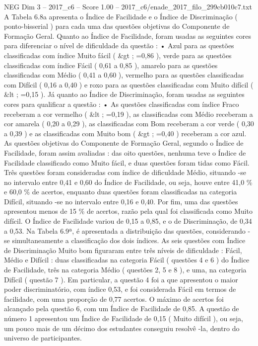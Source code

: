 \begin{textsample}{NEG Dim 3 – 2017\_c6 – Score 1.00 – 2017\_c6/enade\_2017\_filo\_299cb010c7.txt}
A Tabela 6.8a apresenta o Índice de Facilidade e o Índice de Discriminação ( ponto-bisserial ) para cada uma das questões objetivas do Componente de Formação Geral.
Quanto ao Índice de Facilidade, foram usadas as seguintes cores para diferenciar o nível de dificuldade da questão : • Azul para as questões classificadas com índice Muito fácil ( \&gt ; =0,86 ), verde para as questões classificadas com índice Fácil ( 0,61 a 0,85 ), amarelo para as questões classificadas com Médio ( 0,41 a 0,60 ), vermelho para as questões classificadas com Difícil ( 0,16 a 0,40 ) e roxo para as questões classificadas com Muito difícil ( \&lt ; =0,15 ).
Já quanto ao Índice de Discriminação, foram usadas as seguintes cores para qualificar a questão : • As questões classificadas com índice Fraco receberam a cor vermelho ( \&lt ; =0,19 ), as classificadas com Médio receberam a cor amarela ( 0,20 a 0,29 ), as classificadas com Bom receberam a cor verde ( 0,30 a 0,39 ) e as classificadas com Muito bom ( \&gt ; =0,40 ) receberam a cor azul.
As questões objetivas do Componente de Formação Geral, segundo o Índice de Facilidade, foram assim avaliadas : das oito questões, nenhuma teve o Índice de Facilidade classificado como Muito fácil, e duas questões foram tidas como Fácil.
Três questões foram consideradas com índice de dificuldade Médio, situando -se no intervalo entre 0,41 e 0,60 do Índice de Facilidade, ou seja, houve entre 41,0 \% e 60,0 \% de acertos, enquanto duas questões foram classificadas na categoria Difícil, situando -se no intervalo entre 0,16 e 0,40.
Por fim, uma das questões apresentou menos de 15 \% de acertos, razão pela qual foi classificada como Muito difícil.
O Índice de Facilidade variou de 0,15 a 0,85, e o de Discriminação, de 0,34 a 0,53.
Na Tabela 6.9ª, é apresentada a distribuição das questões, considerando -se simultaneamente a classificação dos dois índices.
As seis questões com Índice de Discriminação Muito bom figuraram entre três níveis de dificuldade : Fácil, Médio e Difícil : duas classificadas na categoria Fácil ( questões 4 e 6 ) do Índice de Facilidade, três na categoria Médio ( questões 2, 5 e 8 ), e uma, na categoria Difícil ( questão 7 ).
Em particular, a questão 4 foi a que apresentou o maior poder discriminatório, com índice 0,53, e foi considerada Fácil em termos de facilidade, com uma proporção de 0,77 acertos.
O máximo de acertos foi alcançado pela questão 6, com um Índice de Facilidade de 0,85.
A questão de número 1 apresentou um Índice de Facilidade de 0,15 ( Muito difícil ), ou seja, um pouco mais de um décimo dos estudantes conseguiu resolvê -la, dentro do universo de participantes.

\end{textsample}
